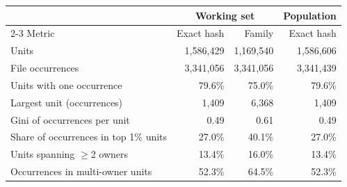 \begin{tabular}{lrrr}
\toprule
 & \multicolumn{2}{c}{Working set} & Population \\
\cmidrule(lr){2-3}
Metric & Exact hash & Family & Exact hash \\
\midrule
Units & 1,586,429 & 1,169,540 & 1,586,606 \\
File occurrences & 3,341,056 & 3,341,056 & 3,341,439 \\
Units with one occurrence & 79.6\% & 75.0\% & 79.6\% \\
Largest unit (occurrences) & 1,409 & 6,368 & 1,409 \\
Gini of occurrences per unit & 0.49 & 0.61 & 0.49 \\
Share of occurrences in top 1\% units & 27.0\% & 40.1\% & 27.0\% \\
Units spanning $\geq$2 owners & 13.4\% & 16.0\% & 13.4\% \\
Occurrences in multi-owner units & 52.3\% & 64.5\% & 52.3\% \\
\bottomrule
\end{tabular}
